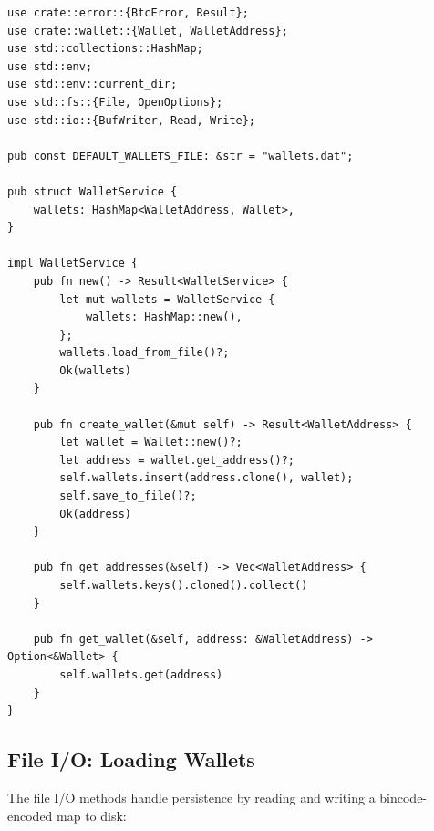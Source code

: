\begin{listing}[htbp]
\caption{ implementation ()}
\label{lst:ch14-wallet-service}
\begin{verbatim}
use crate::error::{BtcError, Result};
use crate::wallet::{Wallet, WalletAddress};
use std::collections::HashMap;
use std::env;
use std::env::current_dir;
use std::fs::{File, OpenOptions};
use std::io::{BufWriter, Read, Write};

pub const DEFAULT_WALLETS_FILE: &str = "wallets.dat";

pub struct WalletService {
    wallets: HashMap<WalletAddress, Wallet>,
}

impl WalletService {
    pub fn new() -> Result<WalletService> {
        let mut wallets = WalletService {
            wallets: HashMap::new(),
        };
        wallets.load_from_file()?;
        Ok(wallets)
    }

    pub fn create_wallet(&mut self) -> Result<WalletAddress> {
        let wallet = Wallet::new()?;
        let address = wallet.get_address()?;
        self.wallets.insert(address.clone(), wallet);
        self.save_to_file()?;
        Ok(address)
    }

    pub fn get_addresses(&self) -> Vec<WalletAddress> {
        self.wallets.keys().cloned().collect()
    }

    pub fn get_wallet(&self, address: &WalletAddress) -> Option<&Wallet> {
        self.wallets.get(address)
    }
}
\end{verbatim}
\end{listing}

\subsection{File I/O: Loading Wallets}
\label{sec:wallet-load}

The file I/O methods handle persistence by reading and writing a bincode-encoded map to disk:

